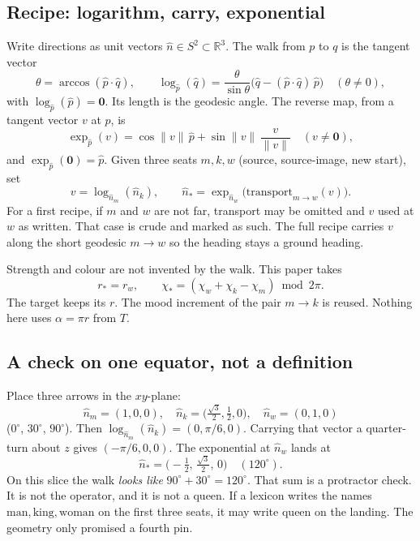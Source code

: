 \documentclass[12pt, a4paper]{article}
\begin{document}
\subsection{Recipe: logarithm, carry, exponential}
\label{subsec:offset_logexp}
Write directions as unit vectors $\hat n\in S^2\subset\mathbb{R}^3$.
The walk from $p$ to $q$ is the tangent vector
\begin{equation}
    \theta = \arccos(\hat p\cdot\hat q),
    \qquad
    \log_{\hat p}(\hat q)
    = \frac{\theta}{\sin\theta}\bigl(\hat q-(\hat p\cdot\hat q)\,\hat p\bigr)
    \quad (\theta\neq 0),
    \label{eq:sphere_log}
\end{equation}
with $\log_{\hat p}(\hat p)=\mathbf{0}$. Its length is the geodesic
angle. The reverse map, from a tangent vector $v$ at $p$, is
\begin{equation}
    \exp_{\hat p}(v)
    = \cos\|v\|\,\hat p + \sin\|v\|\,\frac{v}{\|v\|}
    \quad (v\neq\mathbf{0}),
    \label{eq:sphere_exp}
\end{equation}
and $\exp_{\hat p}(\mathbf{0})=\hat p$. Given three seats
$m,k,w$ (source, source-image, new start), set
\begin{equation}
    v = \log_{\hat n_m}(\hat n_k),
    \qquad
    \hat n_{*}
    = \exp_{\hat n_w}\bigl(\mathrm{transport}_{m\to w}(v)\bigr).
    \label{eq:analogical_offset}
\end{equation}
For a first recipe, if $m$ and $w$ are not far, transport may be
omitted and $v$ used at $w$ as written. That case is crude and
marked as such. The full recipe carries $v$ along the short geodesic
$m\to w$ so the heading stays a ground heading.

Strength and colour are not invented by the walk. This paper takes
\begin{equation}
    r_{*}=r_w,
    \qquad
    \chi_{*}=(\chi_w+\chi_k-\chi_m)\bmod 2\pi.
    \label{eq:offset_rchi}
\end{equation}
The target keeps its $r$. The mood increment of the pair $m\to k$
is reused. Nothing here uses $\alpha=\pi r$ from $T$.

\subsection{A check on one equator, not a definition}
\label{subsec:offset_equator}
Place three arrows in the $xy$-plane:
\[
\hat n_m=(1,0,0),\quad
\hat n_k=\bigl(\tfrac{\sqrt{3}}{2},\tfrac12,0\bigr),\quad
\hat n_w=(0,1,0)
\]
($0^\circ$, $30^\circ$, $90^\circ$). Then
$\log_{\hat n_m}(\hat n_k)=(0,\pi/6,0)$. Carrying that vector a
quarter-turn about $z$ gives $(-\pi/6,0,0)$. The exponential at
$\hat n_w$ lands at
\[
\hat n_{*}=\bigl(-\tfrac12,\,\tfrac{\sqrt{3}}{2},\,0\bigr)
\quad (120^\circ).
\]
On this slice the walk \emph{looks like} $90^\circ+30^\circ=120^\circ$.
That sum is a protractor check. It is not the operator, and it is
not a queen. If a lexicon writes the names
$\mathrm{man},\mathrm{king},\mathrm{woman}$ on the first three seats,
it may write $\mathrm{queen}$ on the landing. The geometry only
promised a fourth pin.
\end{document}
